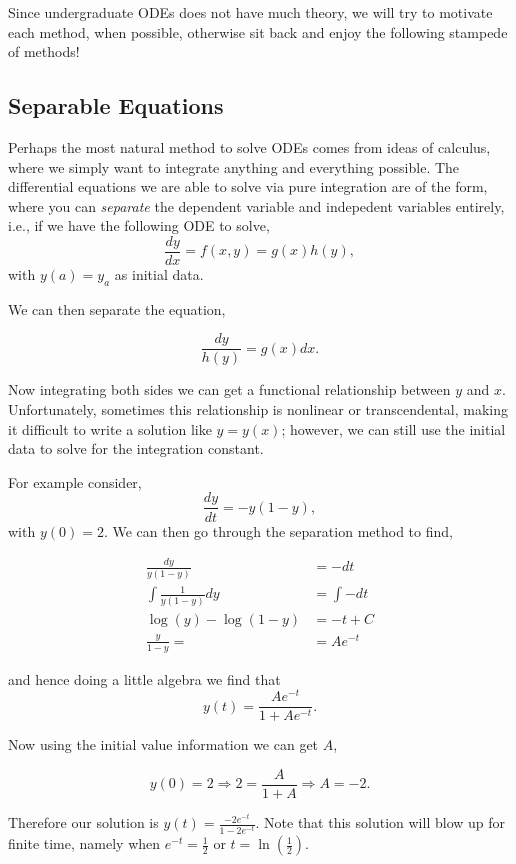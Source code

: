 Since undergraduate ODEs does not have much theory, we will try to motivate each method, when possible, otherwise sit back and enjoy the following stampede of methods!


%
%

\subsection{Separable Equations}

Perhaps the most natural method to solve ODEs comes from ideas of calculus, where we simply want to integrate anything and everything possible. The differential equations we are able to solve via pure integration are of the form, where you can \emph{separate} the dependent variable and indepedent variables entirely, i.e., if we have the following ODE to solve,
$$\frac{dy}{dx} = f(x,y) = g(x) h(y),$$ with $y(a) = y_a$ as initial data. 

We can then separate the equation, 

$$\frac{dy}{h(y)} = g(x) dx.$$

Now integrating  both sides we can get a functional relationship between $y$ and $x$. Unfortunately, sometimes this relationship is nonlinear or transcendental, making it difficult to write a solution like $y=y(x)$; however, we can still use the initial data to solve for the integration constant. 

For example consider, $$\frac{dy}{dt} = -y(1-y),$$ with $y(0)=2$. We can then go through the separation method to find,

\begin{align*}
\frac{dy}{y(1-y)} &= -dt \\
\int \frac{1}{y(1-y)} dy &= \int -dt \\
\log(y) - \log(1-y) &= -t + C \\
\frac{y}{1-y} =&= Ae^{-t} 
\end{align*}

and hence doing a little algebra we find that $$y(t) = \frac{Ae^{-t}}{1+Ae^{-t}}.$$

Now using the initial value information we can get $A$, 

$$y(0)=2 \Rightarrow 2 = \frac{A}{1+A} \Rightarrow A = -2.$$

Therefore our solution is $y(t) = \frac{-2e^{-t}}{1-2e^{-t}}.$ Note that this solution will blow up for finite time, namely when $e^{-t} = \frac{1}{2}$ or $t=\ln\left(\frac{1}{2}\right)$.




